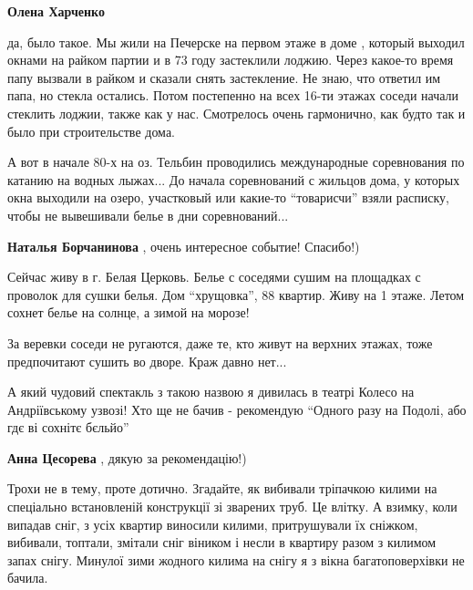 \begin{itemize}
\begin{itemize}
\begin{itemize}
\textbf{Олена Харченко} 

да, было такое. Мы жили на Печерске на первом этаже в доме , который выходил
окнами на райком партии и в 73 году застеклили лоджию. Через какое-то время
папу вызвали в райком и сказали снять застекление. Не знаю, что ответил им
папа, но стекла остались. Потом постепенно на всех 16-ти этажах соседи начали
стеклить лоджии, также как у нас. Смотрелось очень гармонично, как будто так и
было при строительстве дома.

\end{itemize} %


А вот в начале 80-х на оз. Тельбин проводились международные соревнования по
катанию на водных лыжах... До начала соревнований с жильцов дома, у которых
окна выходили на озеро, участковый или какие-то \enquote{товарисчи} взяли расписку,
чтобы не вывешивали белье в дни соревнований...

\begin{itemize} %
\textbf{Наталья Борчанинова} , очень интересное событие! Спасибо!)


Сейчас живу в г. Белая Церковь. Белье с соседями сушим на площадках с проволок
для сушки белья. Дом \enquote{хрущовка}, 88 квартир. Живу на 1 этаже. Летом сохнет
белье на солнце, а зимой на морозе!

За веревки соседи не ругаются, даже те, кто живут на верхних этажах, тоже
предпочитают сушить во дворе. Краж давно нет...

\end{itemize} %

\end{itemize} %


А який чудовий спектакль з такою назвою я дивилась в театрі Колесо на
Андріївському узвозі! Хто ще не бачив - рекомендую \enquote{Одного разу на Подолі, або
гдє ві сохнітє бєльйо}

\textbf{Анна Цесорева} , дякую за рекомендацію!)


Трохи не в тему, проте дотично. Згадайте, як вибивали тріпачкою килими на
спеціально встановленій конструкції зі зварених труб. Це влітку. А взимку, коли
випадав сніг, з усіх квартир виносили килими, притрушували їх сніжком,
вибивали, топтали, змітали сніг віником і несли в квартиру разом з килимом
запах снігу. Минулої зими жодного килима на снігу я з вікна багатоповерхівки не
бачила.


\end{itemize}
